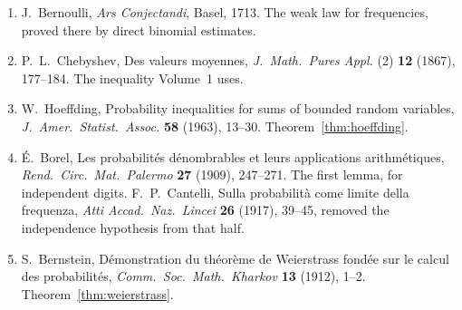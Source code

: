 \begin{enumerate}
\item J.~Bernoulli, \emph{Ars Conjectandi}, Basel, 1713. The weak law for frequencies, proved there by direct binomial estimates.
\item P.~L.~Chebyshev, Des valeurs moyennes, \emph{J.\ Math.\ Pures Appl.} (2) \textbf{12} (1867), 177--184. The inequality Volume~1 uses.
\item W.~Hoeffding, Probability inequalities for sums of bounded random variables, \emph{J.\ Amer.\ Statist.\ Assoc.} \textbf{58} (1963), 13--30. Theorem~\ref{thm:hoeffding}.
\item \'E.~Borel, Les probabilit\'es d\'enombrables et leurs applications arithm\'etiques, \emph{Rend.\ Circ.\ Mat.\ Palermo} \textbf{27} (1909), 247--271. The first lemma, for independent digits. F.~P.~Cantelli, Sulla probabilit\`a come limite della frequenza, \emph{Atti Accad.\ Naz.\ Lincei} \textbf{26} (1917), 39--45, removed the independence hypothesis from that half.
\item S.~Bernstein, D\'emonstration du th\'eor\`eme de Weierstrass fond\'ee sur le calcul des probabilit\'es, \emph{Comm.\ Soc.\ Math.\ Kharkov} \textbf{13} (1912), 1--2. Theorem~\ref{thm:weierstrass}.
\end{enumerate}
